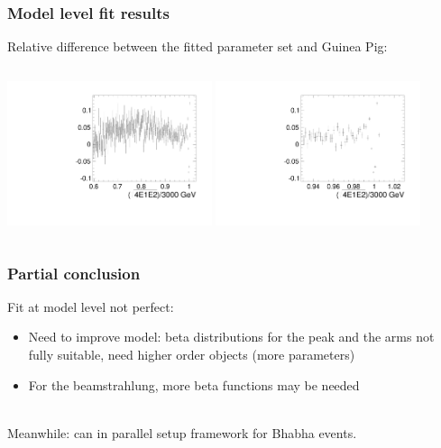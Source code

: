\documentclass{beamer}
\begin{document}
\begin{frame}
\frametitle{Model level fit results}\label{slide:fitres}
Relative difference between the fitted parameter set and Guinea Pig:
\begin{columns}[c]
\column{6cm}
\includegraphics[width=6cm]{Relative_diff_Fit_GP.pdf}
\column{6cm}
\includegraphics[width=6cm]{Relative_diff_Fit_GP_zoom.pdf}
\end{columns}
\end{frame}

\begin{frame}
\frametitle{Partial conclusion}
Fit at model level not perfect:
\begin{itemize}
  \item Need to improve model: beta distributions for the peak and the arms not
  fully suitable, need \alert{higher order objects} (more parameters)
  \item For the beamstrahlung, more beta functions may be needed
\end{itemize} 
~\\
Meanwhile: can in parallel setup framework for \alert{Bhabha events}.
\end{frame}
\end{document}
